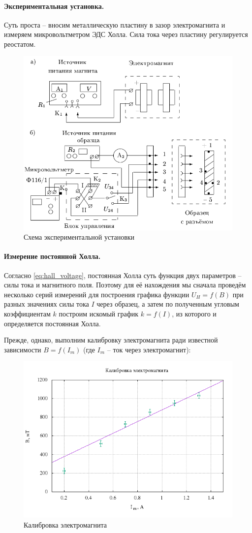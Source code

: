 \documentclass{../lab_class}
\begin{document}
\paragraph{Экспериментальная установка.}
Суть проста -- вносим металлическую пластину в зазор электромагнита и измеряем микровольтметром ЭДС Холла. Сила тока через пластину регулируется реостатом.

\begin{figure}[H]
	\centering
	\includegraphics[width = 0.8 \textwidth]{scheme.png}
	\caption{Схема экспериментальной установки}
	\label{fig:schemet}
\end{figure}

\pagebreak

\paragraph{Измерение постоянной Холла.}
Согласно \eqref{eq:hall_voltage}, постоянная Холла суть функция двух параметров -- силы тока и магнитного поля. Поэтому для её нахождения мы сначала проведём несколько серий измерений для построения графика функции $U_H = f(B)$ при разных значениях силы тока $I$ через образец, а затем по полученным угловым коэффициентам $k$ построим искомый график $k = f(I)$, из которого и определяется постоянная Холла. 

Прежде, однако, выполним калибровку электромагнита ради известной зависимости $B = f(I_m)$ (где $I_m$ -- ток через электромагнит):

\begin{figure}[H]
	\centering
	\includegraphics[width = 0.65 \textwidth]{electromagnet.png}
	\caption{Калибровка электромагнита}
\end{figure}
\end{document}
